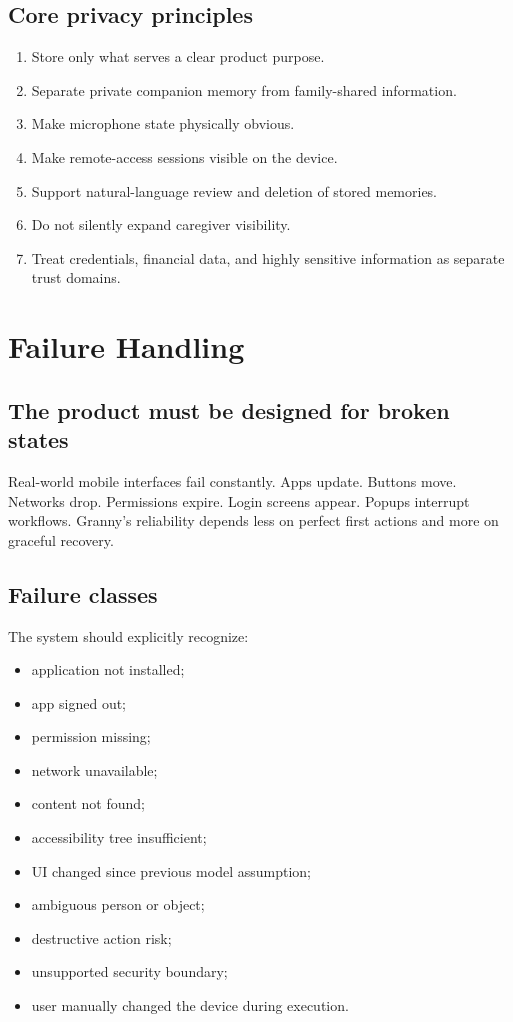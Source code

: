 \documentclass[11pt]{article}
\begin{document}
\subsection{Core privacy principles}
\begin{enumerate}[leftmargin=*]
    \item Store only what serves a clear product purpose.
    \item Separate private companion memory from family-shared information.
    \item Make microphone state physically obvious.
    \item Make remote-access sessions visible on the device.
    \item Support natural-language review and deletion of stored memories.
    \item Do not silently expand caregiver visibility.
    \item Treat credentials, financial data, and highly sensitive information as separate trust domains.
\end{enumerate}

\section{Failure Handling}

\subsection{The product must be designed for broken states}
Real-world mobile interfaces fail constantly. Apps update. Buttons move. Networks drop. Permissions expire. Login screens appear. Popups interrupt workflows. Granny's reliability depends less on perfect first actions and more on graceful recovery.

\subsection{Failure classes}
The system should explicitly recognize:

\begin{itemize}[leftmargin=*]
    \item application not installed;
    \item app signed out;
    \item permission missing;
    \item network unavailable;
    \item content not found;
    \item accessibility tree insufficient;
    \item UI changed since previous model assumption;
    \item ambiguous person or object;
    \item destructive action risk;
    \item unsupported security boundary;
    \item user manually changed the device during execution.
\end{itemize}
\end{document}
